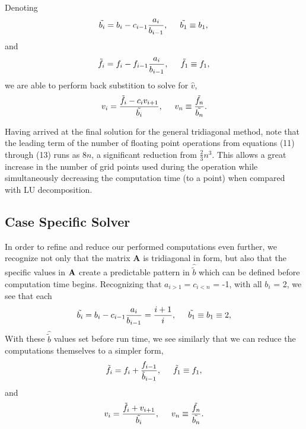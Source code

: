 \documentclass[11pt,a4paper]{article}
\begin{document}
Denoting
\begin{equation}
\tilde{b_i} = b_i - c_{i-1}\frac{a_i}{b_{i-1}}, \hspace{0.5 cm} \tilde{b_1} \equiv b_1, \\
\end{equation}
and
\begin{equation}
\tilde{f_i} = f_i - f_{i-1}\frac{a_i}{b_{i-1}}, \hspace{0.5 cm} \tilde{f_1} \equiv f_1,
\end{equation}
 we are able to perform back substition to solve for $\hat{v}$,
\begin{equation}
v_i = \frac{\tilde{f_i} - c_iv_{i+1}}{\tilde{b_i}}, \hspace{0.5 cm} v_{n} \equiv \frac{\tilde{f_n}}{\tilde{b_n}}.
\end{equation}

Having arrived at the final solution for the general tridiagonal method, note that the leading term of the number of floating point operations from equations (11) through (13) runs as $8n$, a significant reduction from $\frac{2}{3}n^3$. This allows a great increase in the number of grid points used during the operation while simultaneously decreasing the computation time (to a point) when compared with LU decomposition. 

\subsection{Case Specific Solver}

In order to refine and reduce our performed computations even further, we recognize not only that the matrix {\bf A} is tridiagonal in form, but also that the specific values in ${\bf A}$ create a predictable pattern in $\hat{\tilde{b}}$ which can be defined before computation time begins. Recognizing that $a_{i>1} = c_{i<n}$ = -1, with all $b_i$ = 2, we see that each 
\begin{equation*}
\tilde{b_i} = b_i - c_{i-1}\frac{a_i}{b_{i-1}} = \frac{i+1}{i}, \hspace{0.5 cm} \tilde{b_1} \equiv b_1 \equiv 2,
\end{equation*}	
With these $\hat{\tilde{b}}$ values set before run time, we see similarly that we can reduce the computations themselves to a simpler form,
\begin{equation}
\tilde{f_i} = f_i + \frac{f_{i-1}}{\tilde{b}_{i-1}}, \hspace{0.5 cm} \tilde{f_1} \equiv f_1,
\end{equation}
and
\begin{equation}
v_i = \frac{\tilde{f_i} + v_{i+1}}{\tilde{b_i}}, \hspace{0.5 cm} v_{n} \equiv \frac{\tilde{f_n}}{\tilde{b_n}}.
\end{equation}
\end{document}
